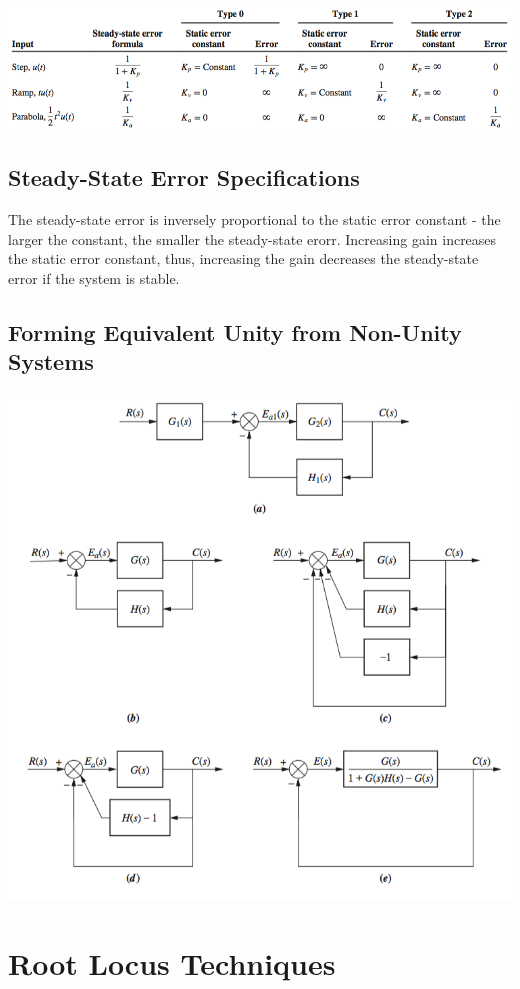 \documentclass[11pt]{article}
\begin{document}
    \begin{center}
        \includegraphics[width=300 px]{img/types} \\
    \end{center}

    \subsection{Steady-State Error Specifications}

   The steady-state error is inversely proportional to the static error constant - the larger the constant, the smaller the steady-state erorr. Increasing gain increases the static error constant, thus, increasing the gain decreases the steady-state error if the system is stable.

   \subsection{Forming Equivalent Unity from Non-Unity Systems}

   \begin{center}
    \includegraphics[width=300 px]{img/nonunity} \\
    \end{center}

    \pagebreak


    \section{Root Locus Techniques}
\end{document}
